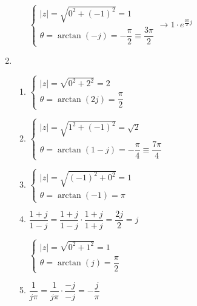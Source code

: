 \begin{enumerate}[label=\color{red}\textbf{\arabic*)}]
\begin{enumerate}[label=\color{red}\textbf{\textbf{\textbf{\alph*)}}}]
                $\begin{cases}
                    |z|=\sqrt{0^2+(-1)^2}=1\\
                    \theta=\arctan(-j)=-\dfrac{\pi}{2}\equiv \dfrac{3\pi}{2}
                \end{cases}\longrightarrow 1\cdot e^{\frac{3\pi}{2} j} $
        \end{enumerate}
    \item {}
        \begin{enumerate}[label=\color{red}\textbf{\textbf{\textbf{\alph*)}}}]
            \item {} 

                $\begin{cases}
                    |z|=\sqrt{0^2+2^2}=2\\
                    \theta=\arctan(2j)=\dfrac{\pi}{2}
                \end{cases}$
            \item {}

                $\begin{cases}
                    |z|=\sqrt{1^2+(-1)^2}=\sqrt{2}\\
                    \theta=\arctan(1-j)=-\dfrac{\pi}{4}\equiv \dfrac{7\pi}{4}
                \end{cases}$
            \item {} 

                $\begin{cases}
                    |z|=\sqrt{(-1)^2+0^2}=1\\
                    \theta=\arctan(-1)=\pi
                \end{cases}$
            \item {} 

                $\dfrac{1+j}{1-j}=\dfrac{1+j}{1-j}\cdot \dfrac{1+j}{1+j}=\dfrac{2j}{2}=j$

                $\begin{cases}
                    |z|=\sqrt{0^2+1^2}=1\\
                    \theta=\arctan(j)=\dfrac{\pi}{2}
                \end{cases}$
            \item {} 

                $\dfrac{1}{j\pi}=\dfrac{1}{j\pi}\cdot \dfrac{-j}{-j}=-\dfrac{j}{\pi}$


\end{enumerate}
\end{enumerate}
